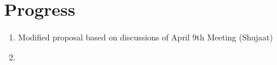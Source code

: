 \section*{Progress}\label{sec:progress}

\begin{enumerate}
    \item Modified proposal based on discussions of April 9th Meeting (Shujaat)
    \item 
\end{enumerate}